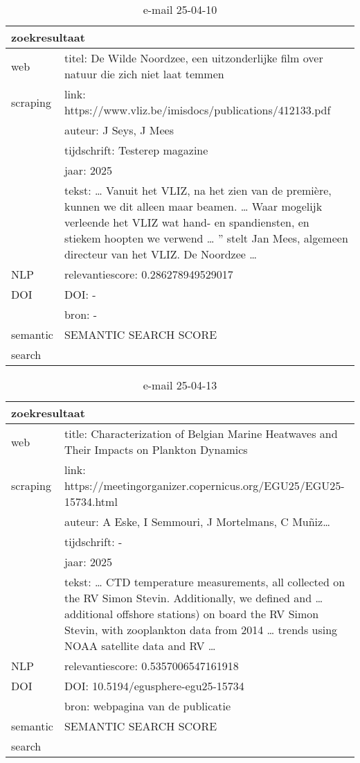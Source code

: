 \begin{table}[h!]
    \caption{e-mail 25-04-10}
    \centering
    \begin{tabularx}{\textwidth}{|p{4cm}|X|} 
        \hline
        \multicolumn{2}{|X|}{\textbf{zoekresultaat}} \\
        \hline
        web &titel: De Wilde Noordzee, een uitzonderlijke film over natuur die zich niet laat temmen\\
        scraping&link: https://www.vliz.be/imisdocs/publications/412133.pdf\\
        &auteur:  J Seys, J Mees\\
        &tijdschrift: Testerep magazine\\
        &jaar: 2025\\
        &tekst: … Vanuit het VLIZ, na het zien van de première, kunnen we dit alleen maar beamen. … Waar mogelijk verleende het VLIZ wat hand- en spandiensten, en stiekem hoopten we verwend … ” stelt Jan Mees, algemeen directeur van het VLIZ. De Noordzee …\\
        \hline
        NLP&relevantiescore: 0.286278949529017\\
        \hline
        DOI&DOI: -\\
        &bron: -\\
        \hline
        semantic&SEMANTIC SEARCH SCORE\\
        search&\\
        \hline
    \end{tabularx}
    \label{table:email20250410}
\end{table}
\begin{table}[h!]
    \caption{e-mail 25-04-13}
    \centering
    \begin{tabularx}{\textwidth}{|p{4cm}|X|} 
        \hline
        \multicolumn{2}{|X|}{\textbf{zoekresultaat}} \\
        \hline
        web &title: Characterization of Belgian Marine Heatwaves and Their Impacts on Plankton Dynamics\\
        scraping&link: https://meetingorganizer.copernicus.org/EGU25/EGU25-15734.html\\
        &auteur: A Eske, I Semmouri, J Mortelmans, C Muñiz…\\
        &tijdschrift: -\\
        &jaar: 2025\\
        &tekst: … CTD temperature measurements, all collected on the RV Simon Stevin. Additionally, we defined and … additional offshore stations) on board the RV Simon Stevin, with zooplankton data from 2014 … trends using NOAA satellite data and RV …\\
        \hline
        NLP&relevantiescore: 0.5357006547161918\\
        \hline
        DOI&DOI: 10.5194/egusphere-egu25-15734\\
        &bron: webpagina van de publicatie\\
        \hline
        semantic&SEMANTIC SEARCH SCORE\\
        search&\\
        \hline
    \end{tabularx}
    \label{table:email20250413}
\end{table}
